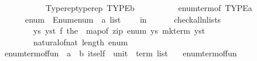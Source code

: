 \begin{isabellebody}
\ \ \ \ \ \ \ \ \ \ {\isacharparenleft}{\kern0pt}{\isasymlambda}{\isacharunderscore}{\kern0pt}{\isachardot}{\kern0pt}\ Typerep{\isachardot}{\kern0pt}typerep\ {\isacharparenleft}{\kern0pt}TYPE{\isacharparenleft}{\kern0pt}{\isacharprime}{\kern0pt}b{\isacharparenright}{\kern0pt}{\isacharparenright}{\kern0pt}{\isacharparenright}{\kern0pt}\isanewline
\ \ \ \ \ \ \ \ \ \ {\isacharparenleft}{\kern0pt}enum{\isacharunderscore}{\kern0pt}term{\isacharunderscore}{\kern0pt}of\ {\isacharparenleft}{\kern0pt}TYPE{\isacharparenleft}{\kern0pt}{\isacharprime}{\kern0pt}a{\isacharparenright}{\kern0pt}{\isacharparenright}{\kern0pt}{\isacharparenright}{\kern0pt}{\isacharsemicolon}{\kern0pt}\isanewline
\ \ \ \ \ \ enum\ {\isacharequal}{\kern0pt}\ {\isacharparenleft}{\kern0pt}Enum{\isachardot}{\kern0pt}enum\ {\isacharcolon}{\kern0pt}{\isacharcolon}{\kern0pt}\ {\isacharprime}{\kern0pt}a\ list{\isacharparenright}{\kern0pt}\isanewline
\ \ \ \ in\isanewline
\ \ \ \ \ \ check{\isacharunderscore}{\kern0pt}all{\isacharunderscore}{\kern0pt}n{\isacharunderscore}{\kern0pt}lists\isanewline
\ \ \ \ \ \ \ \ {\isacharparenleft}{\kern0pt}{\isasymlambda}{\isacharparenleft}{\kern0pt}ys{\isacharcomma}{\kern0pt}\ yst{\isacharparenright}{\kern0pt}{\isachardot}{\kern0pt}\ f\ {\isacharparenleft}{\kern0pt}the\ {\isasymcirc}\ map{\isacharunderscore}{\kern0pt}of\ {\isacharparenleft}{\kern0pt}zip\ enum\ ys{\isacharparenright}{\kern0pt}{\isacharcomma}{\kern0pt}\ mk{\isacharunderscore}{\kern0pt}term\ yst{\isacharparenright}{\kern0pt}{\isacharparenright}{\kern0pt}\isanewline
\ \ \ \ \ \ \ \ {\isacharparenleft}{\kern0pt}natural{\isacharunderscore}{\kern0pt}of{\isacharunderscore}{\kern0pt}nat\ {\isacharparenleft}{\kern0pt}length\ enum{\isacharparenright}{\kern0pt}{\isacharparenright}{\kern0pt}{\isacharparenright}{\kern0pt}{\isachardoublequoteclose}\isanewline
\isanewline
{}\isamarkupfalse%
\ enum{\isacharunderscore}{\kern0pt}term{\isacharunderscore}{\kern0pt}of{\isacharunderscore}{\kern0pt}fun\ {\isacharcolon}{\kern0pt}{\isacharcolon}{\kern0pt}\ {\isachardoublequoteopen}{\isacharparenleft}{\kern0pt}{\isacharprime}{\kern0pt}a\ {\isasymRightarrow}\ {\isacharprime}{\kern0pt}b{\isacharparenright}{\kern0pt}\ itself\ {\isasymRightarrow}\ unit\ {\isasymRightarrow}\ term\ list{\isachardoublequoteclose}\isanewline
\ \ \ {\isachardoublequoteopen}enum{\isacharunderscore}{\kern0pt}term{\isacharunderscore}{\kern0pt}of{\isacharunderscore}{\kern0pt}fun\ {\isacharequal}{\kern0pt}\isanewline
\ \ \ \ {\isacharparenleft}{\kern0pt}{\isasymlambda}{\isacharunderscore}{\kern0pt}\ {\isacharunderscore}{\kern0pt}{\isachardot}{\kern0pt}\isanewline

\end{isabellebody}
